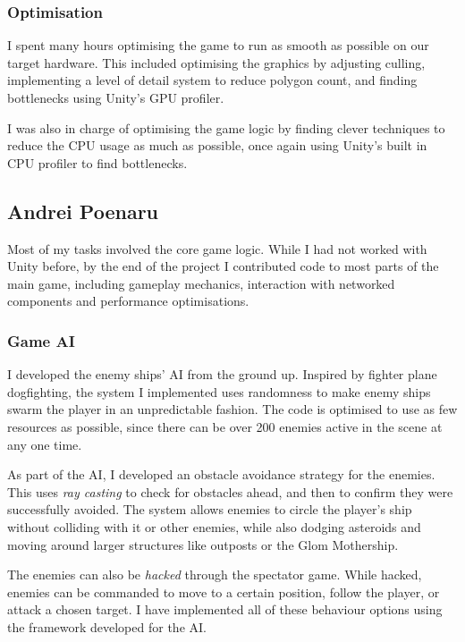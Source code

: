 \documentclass[a4paper,11pt]{article}
\begin{document}
\subsubsection{Optimisation}
I spent many hours optimising the game to run as smooth as possible on our target hardware. This included optimising the graphics by adjusting culling, implementing a level of detail system to reduce polygon count, and finding bottlenecks using Unity’s GPU profiler.

I was also in charge of optimising the game logic by finding clever techniques to reduce the CPU usage as much as possible, once again using Unity’s built in CPU profiler to find bottlenecks.

\clearpage

\subsection{Andrei Poenaru}

Most of my tasks involved the core game logic. While I had not worked with Unity before, by the end of the project I contributed code to most parts of the main game, including gameplay mechanics, interaction with networked components and performance optimisations.

\subsubsection{Game AI}

I developed the enemy ships’ AI from the ground up. Inspired by fighter plane dogfighting, the system I implemented uses randomness to make enemy ships swarm the player in an unpredictable fashion. The code is optimised to use as few resources as possible, since there can be over 200 enemies active in the scene at any one time.

As part of the AI, I developed an obstacle avoidance strategy for the enemies. This uses \emph{ray casting} to check for obstacles ahead, and then to confirm they were successfully avoided. The system allows enemies to circle the player’s ship without colliding with it or other enemies, while also dodging asteroids and moving around larger structures like outposts or the Glom Mothership.

The enemies can also be \emph{hacked} through the spectator game. While hacked, enemies can be commanded to move to a certain position, follow the player, or attack a chosen target. I have implemented all of these behaviour options using the framework developed for the AI.
\end{document}
